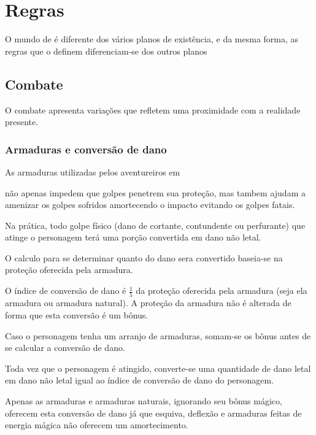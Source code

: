 \chapter{Regras}
\begin{multicols}{2}
O mundo de  \'e diferente dos v\'arios
planos de exist\^encia, e da mesma forma, as regras que o definem
diferenciam-se dos outros planos

\section{Combate}
O combate apresenta varia\c{c}\~oes que refletem uma proximidade
com a realidade presente.

\subsection{Armaduras e convers\~ao de dano}
As armaduras utilizadas pelos aventureiros em

n\~ao apenas impedem que golpes penetrem sua prote\c{c}\~ao,
mas tambem ajudam a amenizar os golpes sofridos
amortecendo o impacto evitando os golpes fatais.

Na pr\'atica, todo golpe f\'isico (dano de cortante,
contundente ou perfurante) que atinge o personagem
ter\'a uma por\c{c}\~ao convertida em dano n\~ao letal.

O calculo para se determinar quanto do dano sera convertido
baseia-se na prote\c{c}\~ao oferecida pela armadura.

O \'indice de convers\~ao de dano \'e
\(\frac{1}{5}\) da prote\c{c}\~ao oferecida pela armadura
(seja ela armadura ou armadura natural).
A prote\c{c}\~ao da armadura n\~ao \'e alterada de forma que esta
convers\~ao \'e um b\^onus.

Caso o personagem tenha um arranjo de armaduras, somam-se os b\^onus
antes de se calcular a convers\~ao de dano.

Toda vez que o personagem \'e atingido, converte-se
uma quantidade de dano letal em dano n\~ao letal
igual ao \'indice de convers\~ao de dano do personagem.

Apenas as armaduras e armaduras naturais, ignorando
seu b\^onus m\'agico, oferecem esta convers\~ao de dano
j\'a que esquiva, deflex\~ao e armaduras feitas de energia
m\'agica n\~ao oferecem um amortecimento.
\end{multicols}
